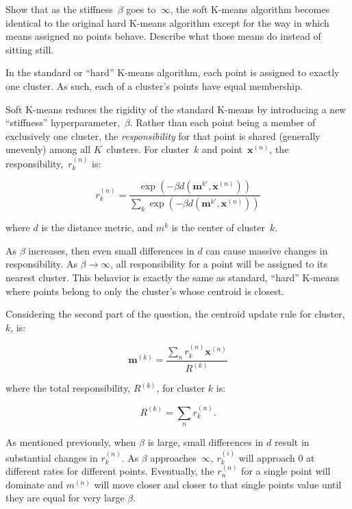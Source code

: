 \newpage
\begin{problem}{20}{2}{2}
  Show that as the stiffness~$\beta$ goes to~$\infty$, the soft K-means algorithm becomes identical to the original hard K-means algorithm except for the way in which means assigned no points behave.  Describe what those means do instead of sitting still.
\end{problem}

In the standard or ``hard'' K-means algorithm, each point is assigned to exactly one cluster.  As such, each of a cluster's points have equal membership.

Soft K-means reduces the rigidity of the standard K-means by introducing a new ``stiffness'' hyperparameter,~$\beta$.  Rather than each point being a member of exclusively one cluster, the \textit{responsibility} for that point is shared (generally unevenly) among all $K$~clusters.  For cluster~$k$ and point~$\textbf{x}^{(n)}$, the responsibility,~$r_{k}^{(n)}$ is:

\begin{equation}
  r_k^{(n)} = \frac{\exp(-\beta d(\textbf{m}^{k'}, \textbf{x}^{(n)}))}{\sum_{k} \exp(-\beta d(\textbf{m}^{k'}, \textbf{x}^{(n)}))}
\end{equation}

\noindent
where $d$ is the distance metric, and $m^{k}$ is the center of cluster~$k$.

As $\beta$ increases, then even small differences in $d$ can cause massive changes in responsibility.  As ${\beta \rightarrow \infty}$, all responsibility for a point will be assigned to its nearest cluster.  This behavior is exactly the same as standard, ``hard'' K-means where points belong to only the cluster's whose centroid is closest.

Considering the second part of the question, the centroid update rule for cluster,~$k$, is:

\[ \mathbf{m}^{(k)} = \frac{\sum_{n}r^{(n)}_k \mathbf{x}^{(n)}}{R^{(k)}} \]

\noindent
where the total responsibility, $R^{(k)}$, for cluster $k$ is:

\[ R^{(k)}=\sum_{n} r_{k}^{(n)} \text{.} \]

As mentioned previously, when $\beta$ is large, small differences in $d$ result in substantial changes in $r_{k}^{(n)}$. As $\beta$ approaches~$\infty$, $r_{k}^{(i)}$ will approach $0$ at different rates for different points.  Eventually, the $r_{n}^{(n)}$ for a single point will dominate and $m^{(n)}$ will move closer and closer to that single points value until they are equal for very large $\beta$.